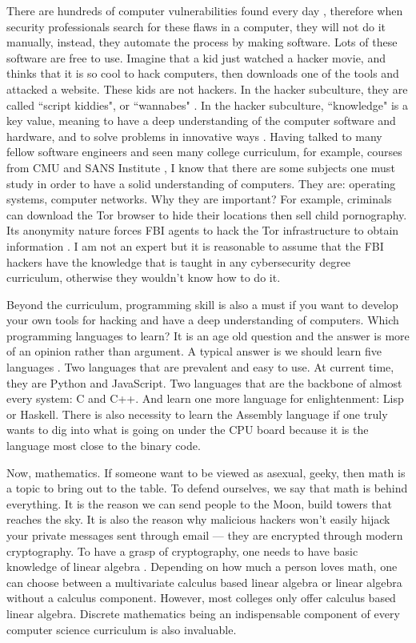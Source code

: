 \documentclass{article}
\begin{document}
There are hundreds of computer vulnerabilities found every day \cite[p.~86]{Holt2017}, therefore when security professionals search for these flaws in a computer, they will not do it manually, instead, they automate the process by making software. Lots of these software are free to use. Imagine that a kid just watched a hacker movie, and thinks that it is so cool to hack computers, then downloads one of the tools and attacked a website. These kids are not hackers. In the hacker subculture, they are called ``script kiddies", or ``wannabes" \cite[p.~116]{Holt2017}. In the hacker subculture, ``knowledge" is a key value, meaning to have a deep understanding of the computer software and hardware, and to solve problems in innovative ways \cite[p.~130]{Holt2017}. Having talked to many fellow software engineers and seen many college curriculum, for example, courses from CMU \cite{CMU} and SANS Institute \cite{SANS}, I know that there are some subjects one must study in order to have a solid understanding of computers. They are: operating systems, computer networks. Why they are important? For example, criminals can download the Tor browser to hide their locations then sell child pornography. Its anonymity nature forces FBI agents to hack the Tor infrastructure to obtain information \cite[p.~311]{Holt2017}. I am not an expert but it is reasonable to assume that the FBI hackers have the knowledge that is taught in any cybersecurity degree curriculum, otherwise they wouldn't know how to do it.

Beyond the curriculum, programming skill is also a must if you want to develop your own tools for hacking and have a deep understanding of computers. Which programming languages to learn? It is an age old question and the answer is more of an opinion rather than argument. A typical answer is we should learn five languages \cite{HOW}. Two languages that are prevalent and easy to use. At current time, they are Python and JavaScript. Two languages that are the backbone of almost every system: C and C++. And learn one more language for enlightenment: Lisp or Haskell. There is also necessity to learn the Assembly language if one truly wants to dig into what is going on under the CPU board because it is the language most close to the binary code.

Now, mathematics. If someone want to be viewed as asexual, geeky, then math is a topic to bring out to the table. To defend ourselves, we say that math is behind everything. It is the reason we can send people to the Moon, build towers that reaches the sky. It is also the reason why malicious hackers won't easily hijack your private messages sent through email --- they are encrypted through modern cryptography. To have a grasp of cryptography, one needs to have basic knowledge of linear algebra \cite[p.~v]{Hoffstein2016}. Depending on how much a person loves math, one can choose between a multivariate calculus based linear algebra or linear algebra without a calculus component. However, most colleges only offer calculus based linear algebra. Discrete mathematics being an indispensable component of every computer science curriculum is also invaluable.
\end{document}

